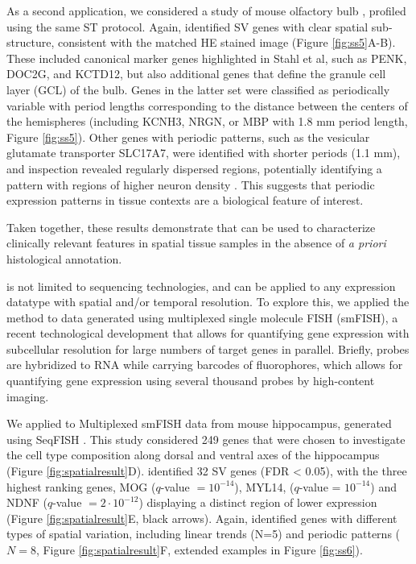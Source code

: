 As a second application, we considered a study of mouse olfactory bulb \cite{Stahl2016-ym}, profiled using the same ST protocol. Again,  identified SV genes with clear spatial sub-structure, consistent with the matched HE stained image (Figure \ref{fig:ss5}A-B). These included canonical marker genes highlighted in Stahl et al, such as PENK, DOC2G, and KCTD12, but also additional genes that define the granule cell layer (GCL) of the bulb. Genes in the latter set were classified as periodically variable with period lengths corresponding to the distance between the centers of the hemispheres (including KCNH3, NRGN, or MBP with 1.8 mm period length, Figure \ref{fig:ss5}). Other genes with periodic patterns, such as the vesicular glutamate transporter SLC17A7, were identified with shorter periods (1.1 mm), and inspection revealed regularly dispersed regions, potentially identifying a pattern with regions of higher neuron density \cite{Jahn2000-yw}. This suggests that periodic expression patterns in tissue contexts are a biological feature of interest.

Taken together, these results demonstrate that  can be used to characterize clinically relevant features in spatial tissue samples in the absence of \textit{a priori} histological annotation.

 is not limited to sequencing technologies, and can be applied to any expression datatype with spatial and/or temporal resolution. To explore this, we applied the method to data generated using multiplexed single molecule FISH (smFISH), a recent technological development that allows for quantifying gene expression with subcellular resolution for large numbers of target genes in parallel. Briefly, probes are hybridized to RNA while carrying barcodes of fluorophores, which allows for quantifying gene expression using several thousand probes \cite{Chen2015-rm} by high-content imaging.

We applied  to Multiplexed smFISH data from mouse hippocampus, generated using SeqFISH \cite{Shah2016-bi}. This study considered 249 genes that were chosen to investigate the cell type composition along dorsal and ventral axes of the hippocampus (Figure \ref{fig:spatialresult}D).  identified 32 SV genes (FDR < 0.05), with the three highest ranking genes, MOG (\( q \)-value \( = 10^{-14} \)), MYL14, (\( q \)-value = \( 10^{-14} \)) and NDNF (\( q \)-value \( = 2 \cdot 10^{-12} \)) displaying a distinct region of lower expression (Figure \ref{fig:spatialresult}E, black arrows). Again,  identified genes with different types of spatial variation, including linear trends (N=5) and periodic patterns (\( N = 8 \), Figure \ref{fig:spatialresult}F, extended examples in Figure \ref{fig:ss6}).

